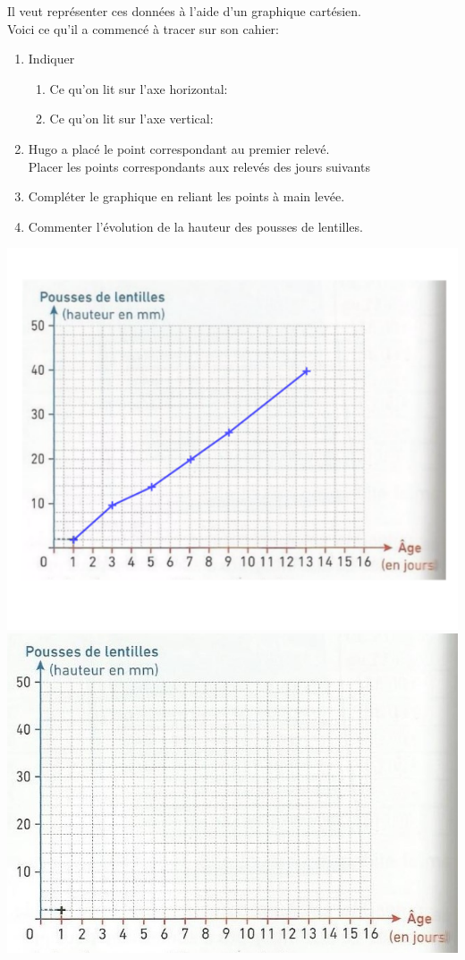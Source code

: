 \documentclass[12pt,a4paper]{article}
\begin{document}
\begin{minipage}{0.5\textwidth}
Il veut représenter ces données à l’aide d’un graphique cartésien.\\
Voici ce qu’il a commencé à tracer sur son cahier:
\begin{enumerate}
\item Indiquer
	\begin{enumerate}
		\item Ce qu’on lit sur l’axe horizontal:\\
		\item Ce qu’on lit sur l’axe vertical:\\
	\end{enumerate}
	\item Hugo a placé le point correspondant au premier relevé.\\
	Placer les points correspondants aux relevés des jours suivants
	\item Compléter le graphique en reliant les points à main levée.
	\item Commenter l’évolution de la hauteur des pousses de lentilles.
\end{enumerate}
\end{minipage}
\begin{minipage}{0.4\textwidth}
\ifdefined\isprof
\includegraphics[scale=1]{img/act-2-corr.png}
\else
\includegraphics[scale=1]{img/act-2.png}
\fi
\end{minipage}
\end{document}
